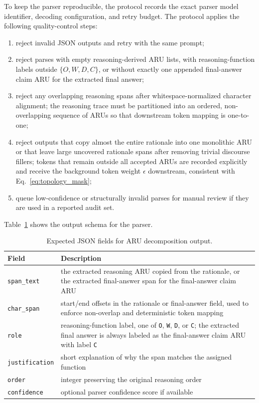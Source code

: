 \documentclass[a4paper,fleqn,doubleblind]{cas-sc}
\begin{document}
To keep the parser reproducible, the protocol records the exact parser model identifier, decoding configuration, and retry budget. The protocol applies the following quality-control steps:
\begin{enumerate}[leftmargin=*]
    \item reject invalid JSON outputs and retry with the same prompt;
    \item reject parses with empty reasoning-derived ARU lists, with reasoning-function labels outside $\{O,W,D,C\}$, or without exactly one appended final-answer claim ARU for the extracted final answer;
    \item reject any overlapping reasoning spans after whitespace-normalized character alignment; the reasoning trace must be partitioned into an ordered, non-overlapping sequence of ARUs so that downstream token mapping is one-to-one;
    \item reject outputs that copy almost the entire rationale into one monolithic ARU or that leave large uncovered rationale spans after removing trivial discourse fillers; tokens that remain outside all accepted ARUs are recorded explicitly and receive the background token weight $\epsilon$ downstream, consistent with Eq.~\ref{eq:topology_mask};
    \item queue low-confidence or structurally invalid parses for manual review if they are used in a reported audit set.
\end{enumerate}

Table~\ref{tab:aru_output_schema} shows the output schema for the parser.

\begin{table}[htbp]
    \centering
    \caption{Expected JSON fields for ARU decomposition output.}
    \label{tab:aru_output_schema}
    \begin{tabular}{lp{}}
        \toprule
        \textbf{Field} & \textbf{Description} \\
        \midrule
        \texttt{span\_text} & the extracted reasoning ARU copied from the rationale, or the extracted final-answer span for the final-answer claim ARU \\
        \texttt{char\_span} & start/end offsets in the rationale or final-answer field, used to enforce non-overlap and deterministic token mapping \\
        \texttt{role} & reasoning-function label, one of \texttt{O}, \texttt{W}, \texttt{D}, or \texttt{C}; the extracted final answer is always labeled as the final-answer claim ARU with label \texttt{C} \\
        \texttt{justification} & short explanation of why the span matches the assigned function \\
        \texttt{order} & integer preserving the original reasoning order \\
        \texttt{confidence} & optional parser confidence score if available \\
        \bottomrule
    \end{tabular}
\end{table}
\end{document}
